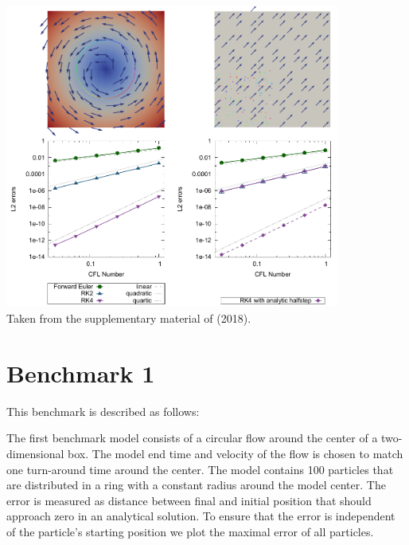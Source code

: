 \begin{center}
\includegraphics[width=11cm]{python_codes/fieldstone_122/images/galh18.png}\\
{\captionfont Taken from the supplementary material of \textcite{galh18} (2018).}
\end{center}

\section*{Benchmark 1}

This benchmark is described as follows:
\begin{displayquote}
The first benchmark model consists of a circular flow
around the center of a two-dimensional box. The model
end time and velocity of the flow is chosen to match one
turn-around time around the center. The model contains
100 particles that are distributed in a ring with a constant
radius around the model center. The error is measured as
distance between final and initial position that should approach 
zero in an analytical solution. To ensure that the
error is independent of the particle’s starting position we
plot the maximal error of all particles.
\end{displayquote}

